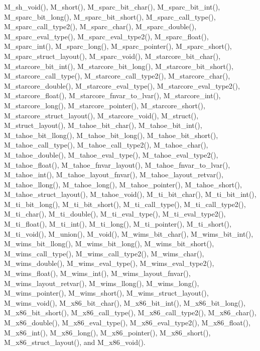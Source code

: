 M\_\-sh\_\-void(), M\_\-short(), M\_\-sparc\_\-bit\_\-char(), M\_\-sparc\_\-bit\_\-int(), M\_\-sparc\_\-bit\_\-long(), M\_\-sparc\_\-bit\_\-short(), M\_\-sparc\_\-call\_\-type(), M\_\-sparc\_\-call\_\-type2(), M\_\-sparc\_\-char(), M\_\-sparc\_\-double(), M\_\-sparc\_\-eval\_\-type(), M\_\-sparc\_\-eval\_\-type2(), M\_\-sparc\_\-float(), M\_\-sparc\_\-int(), M\_\-sparc\_\-long(), M\_\-sparc\_\-pointer(), M\_\-sparc\_\-short(), M\_\-sparc\_\-struct\_\-layout(), M\_\-sparc\_\-void(), M\_\-starcore\_\-bit\_\-char(), M\_\-starcore\_\-bit\_\-int(), M\_\-starcore\_\-bit\_\-long(), M\_\-starcore\_\-bit\_\-short(), M\_\-starcore\_\-call\_\-type(), M\_\-starcore\_\-call\_\-type2(), M\_\-starcore\_\-char(), M\_\-starcore\_\-double(), M\_\-starcore\_\-eval\_\-type(), M\_\-starcore\_\-eval\_\-type2(), M\_\-starcore\_\-float(), M\_\-starcore\_\-fnvar\_\-to\_\-lvar(), M\_\-starcore\_\-int(), M\_\-starcore\_\-long(), M\_\-starcore\_\-pointer(), M\_\-starcore\_\-short(), M\_\-starcore\_\-struct\_\-layout(), M\_\-starcore\_\-void(), M\_\-struct(), M\_\-struct\_\-layout(), M\_\-tahoe\_\-bit\_\-char(), M\_\-tahoe\_\-bit\_\-int(), M\_\-tahoe\_\-bit\_\-llong(), M\_\-tahoe\_\-bit\_\-long(), M\_\-tahoe\_\-bit\_\-short(), M\_\-tahoe\_\-call\_\-type(), M\_\-tahoe\_\-call\_\-type2(), M\_\-tahoe\_\-char(), M\_\-tahoe\_\-double(), M\_\-tahoe\_\-eval\_\-type(), M\_\-tahoe\_\-eval\_\-type2(), M\_\-tahoe\_\-float(), M\_\-tahoe\_\-fnvar\_\-layout(), M\_\-tahoe\_\-fnvar\_\-to\_\-lvar(), M\_\-tahoe\_\-int(), M\_\-tahoe\_\-layout\_\-fnvar(), M\_\-tahoe\_\-layout\_\-retvar(), M\_\-tahoe\_\-llong(), M\_\-tahoe\_\-long(), M\_\-tahoe\_\-pointer(), M\_\-tahoe\_\-short(), M\_\-tahoe\_\-struct\_\-layout(), M\_\-tahoe\_\-void(), M\_\-ti\_\-bit\_\-char(), M\_\-ti\_\-bit\_\-int(), M\_\-ti\_\-bit\_\-long(), M\_\-ti\_\-bit\_\-short(), M\_\-ti\_\-call\_\-type(), M\_\-ti\_\-call\_\-type2(), M\_\-ti\_\-char(), M\_\-ti\_\-double(), M\_\-ti\_\-eval\_\-type(), M\_\-ti\_\-eval\_\-type2(), M\_\-ti\_\-float(), M\_\-ti\_\-int(), M\_\-ti\_\-long(), M\_\-ti\_\-pointer(), M\_\-ti\_\-short(), M\_\-ti\_\-void(), M\_\-union(), M\_\-void(), M\_\-wims\_\-bit\_\-char(), M\_\-wims\_\-bit\_\-int(), M\_\-wims\_\-bit\_\-llong(), M\_\-wims\_\-bit\_\-long(), M\_\-wims\_\-bit\_\-short(), M\_\-wims\_\-call\_\-type(), M\_\-wims\_\-call\_\-type2(), M\_\-wims\_\-char(), M\_\-wims\_\-double(), M\_\-wims\_\-eval\_\-type(), M\_\-wims\_\-eval\_\-type2(), M\_\-wims\_\-float(), M\_\-wims\_\-int(), M\_\-wims\_\-layout\_\-fnvar(), M\_\-wims\_\-layout\_\-retvar(), M\_\-wims\_\-llong(), M\_\-wims\_\-long(), M\_\-wims\_\-pointer(), M\_\-wims\_\-short(), M\_\-wims\_\-struct\_\-layout(), M\_\-wims\_\-void(), M\_\-x86\_\-bit\_\-char(), M\_\-x86\_\-bit\_\-int(), M\_\-x86\_\-bit\_\-long(), M\_\-x86\_\-bit\_\-short(), M\_\-x86\_\-call\_\-type(), M\_\-x86\_\-call\_\-type2(), M\_\-x86\_\-char(), M\_\-x86\_\-double(), M\_\-x86\_\-eval\_\-type(), M\_\-x86\_\-eval\_\-type2(), M\_\-x86\_\-float(), M\_\-x86\_\-int(), M\_\-x86\_\-long(), M\_\-x86\_\-pointer(), M\_\-x86\_\-short(), M\_\-x86\_\-struct\_\-layout(), and M\_\-x86\_\-void().
